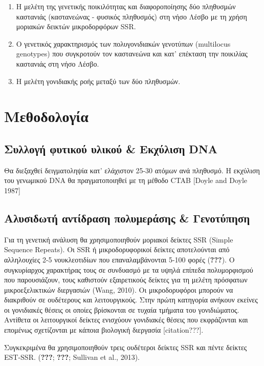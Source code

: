 \documentclass[12pt,a4paper,]{report}
\begin{document}
\begin{enumerate}
\def\labelenumi{\arabic{enumi}.}
\item
  Η μελέτη της γενετικής ποικιλότητας και διαφοροποίησης δύο πληθυσμών
  καστανιάς (καστανεώνας - φυσικός πληθυσμός) στη νήσο Λέσβο με τη χρήση
  μοριακών δεικτών μικροδορφόρων SSR.
\item
  Ο γενετικός χαρακτηρισμός των πολυγονιδιακών γενοτύπων (multilocus
  genotypes) που συγκροτούν τον καστανεώνα και κατ' επέκταση την
  ποικιλίας καστανιάς στη νήσο Λέσβο.
\item
  Η μελέτη γονιδιακής ροής μεταξύ των δύο πληθυσμών.
\end{enumerate}

\section{Μεθοδολογία}

\hypertarget{----dna}{%
\subsection{Συλλογή φυτικού υλικού \& Εκχύλιση DNA}\label{----dna}}

Θα διεξαχθεί δειγματοληψία κατ' ελάχιστον 25-30 ατόμων ανά πληθυσμό. Η
εκχύλιση του γενωμικού DNA θα πραγματοποιηθεί με τη μέθοδο CTAB {[}Doyle
and Doyle 1987{]}

\hypertarget{---}{%
\subsection{Αλυσιδωτή αντίδραση πολυμεράσης \& Γενοτύπηση}\label{---}}

Για τη γενετική ανάλυση θα χρησιμοποιηθούν μοριακοί δείκτες SSR (Simple
Sequence Repeats). Οι SSR ή μικροδορυφορικοί δείκτες αποτελούνται από
αλληλουχίες 2-5 νουκλεοτιδίων που επαναλαμβάνονται 5-100 φορές
({\textbf{???}}). Ο συγκυρίαρχος χαρακτήρας τους σε συνδυασμό με τα
υψηλά επίπεδα πολυμορφισμού που παρουσιάζουν, τους καθιστούν
εξαιρετικούς δείκτες για τη μελέτη πρόσφατων μικροεξελικτικών διεργασιών
(Wang, 2010). Οι μικροδορυφόροι μπορούν να διακριθούν σε ουδέτερους και
λειτουργικούς. Στην πρώτη κατηγορία ανήκουν εκείνες οι γονιδιακές θέσεις
οι οποίες βρίσκονται σε τυχαία τμήματα του γονιδιώματος. Αντίθετα οι
λειτουργικοί δείκτες ενισχύουν γονιδιακές θέσεις που εκφράζονται και
επομένως σχετίζονται με κάποια βιολογική διεργασία {[}citation???{]}.

Συγκεκριμένα θα χρησιμοποιηθούν τρεις ουδέτεροι δείκτες SSR και πέντε
δείκτες EST-SSR. ({\textbf{???}}; {\textbf{???}}; Sullivan et al.,
2013).
\end{document}
